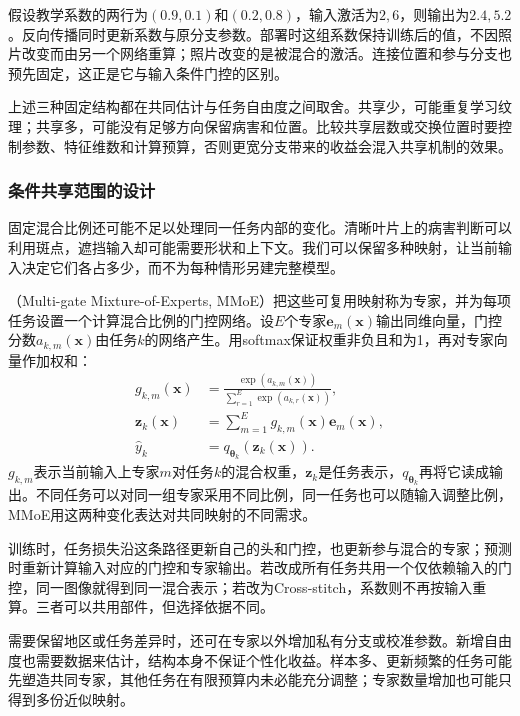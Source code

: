 假设教学系数的两行为$(0.9,0.1)$和$(0.2,0.8)$，输入激活为$2,6$，则输出为$2.4,5.2$。反向传播同时更新系数与原分支参数。部署时这组系数保持训练后的值，不因照片改变而由另一个网络重算；照片改变的是被混合的激活。连接位置和参与分支也预先固定，这正是它与输入条件门控的区别。

上述三种固定结构都在共同估计与任务自由度之间取舍。共享少，可能重复学习纹理；共享多，可能没有足够方向保留病害和位置。比较共享层数或交换位置时要控制参数、特征维数和计算预算，否则更宽分支带来的收益会混入共享机制的效果。

\subsubsection{条件共享范围的设计}
\label{sec:ket-sharing-conditional}

固定混合比例还可能不足以处理同一任务内部的变化。清晰叶片上的病害判断可以利用斑点，遮挡输入却可能需要形状和上下文。我们可以保留多种映射，让当前输入决定它们各占多少，而不为每种情形另建完整模型。

（Multi-gate Mixture-of-Experts, MMoE）把这些可复用映射称为专家，并为每项任务设置一个计算混合比例的门控网络。设$E$个专家$\bm e_m(\bm x)$输出同维向量，门控分数$a_{k,m}(\bm x)$由任务$k$的网络产生。用softmax保证权重非负且和为1，再对专家向量作加权和：
\begin{align}
  g_{k,m}(\bm x)
    &=\frac{\exp(a_{k,m}(\bm x))}
      {\sum_{r=1}^{E}\exp(a_{k,r}(\bm x))},
  \\
  \bm z_k(\bm x)
    &=\sum_{m=1}^{E}g_{k,m}(\bm x)\bm e_m(\bm x),
  \nonumber\\
  \hat y_k&=q_{\bm{\theta}_k}(\bm z_k(\bm x)).
  \label{eq:ket-sharing-mmoe}
\end{align}
$g_{k,m}$表示当前输入上专家$m$对任务$k$的混合权重，$\bm z_k$是任务表示，$q_{\bm{\theta}_k}$再将它读成输出。不同任务可以对同一组专家采用不同比例，同一任务也可以随输入调整比例，MMoE用这两种变化表达对共同映射的不同需求。

训练时，任务损失沿这条路径更新自己的头和门控，也更新参与混合的专家；预测时重新计算输入对应的门控和专家输出。若改成所有任务共用一个仅依赖输入的门控，同一图像就得到同一混合表示；若改为Cross-stitch，系数则不再按输入重算。三者可以共用部件，但选择依据不同。

需要保留地区或任务差异时，还可在专家以外增加私有分支或校准参数。新增自由度也需要数据来估计，结构本身不保证个性化收益。样本多、更新频繁的任务可能先塑造共同专家，其他任务在有限预算内未必能充分调整；专家数量增加也可能只得到多份近似映射。

